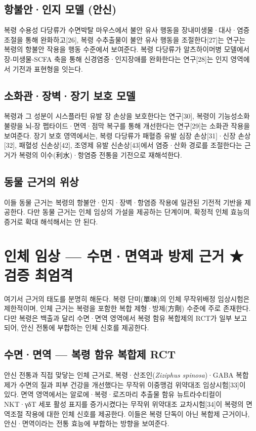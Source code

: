 \documentclass[12pt,oneside]{book}
\begin{document}
\subsection{항불안·인지 모델 (안신)}

복령 수용성 다당류가 수면박탈 마우스에서 불안 유사 행동을 장내미생물·대사·염증 조절을 통해 완화하고[26], 복령 수추출물이 불안 유사 행동을 조절한다[27]는 연구는 복령의 항불안 작용을 행동 수준에서 보여준다. 복령 다당류가 알츠하이머병 모델에서 장-미생물-SCFA 축을 통해 신경염증·인지장애를 완화한다는 연구[28]는 인지 영역에서 기전과 표현형을 잇는다.

\subsection{소화관·장벽·장기 보호 모델}

복령과 그 성분이 시스플라틴 유발 장 손상을 보호한다는 연구[30], 복령이 기능성소화불량을 뇌-장 펩타이드·면역·점막 복구를 통해 개선한다는 연구[29]는 소화관 작용을 보여준다. 장기 보호 영역에서는, 복령 다당류가 패혈증 유발 심장 손상[31]·신장 손상[32], 패혈성 신손상[42], 조영제 유발 신손상[43]에서 염증·산화 경로를 조절한다는 근거가 복령의 이수(利水)·항염증 전통을 기전으로 재해석한다.

\subsection{동물 근거의 위상}

이들 동물 근거는 복령의 항불안·인지·장벽·항염증 작용에 일관된 기전적 기반을 제공한다. 다만 동물 근거는 인체 임상의 가설을 제공하는 단계이며, 확정적 인체 효능의 증거로 확대 해석해서는 안 된다.

\section{인체 임상 — 수면·면역과 방제 근거 ★검증 최엄격}

여기서 근거의 태도를 분명히 해둔다. 복령 단미(單味)의 인체 무작위배정 임상시험은 제한적이며, 인체 근거는 복령을 포함한 복합 제형·방제(方劑) 수준에 주로 존재한다. 다만 복령은 백출과 달리 수면·면역 영역에서 복령 함유 복합제의 RCT가 일부 보고되어, 안신 전통에 부합하는 인체 신호를 제공한다.

\subsection{수면·면역 — 복령 함유 복합제 RCT}

안신 전통과 직접 맞닿는 인체 근거로, 복령·산조인(\textit{Ziziphus spinosa})·GABA 복합제가 수면의 질과 피부 건강을 개선했다는 무작위 이중맹검 위약대조 임상시험[33]이 있다. 면역 영역에서는 알로에·복령·로즈마리 추출물 함유 뉴트라수티컬이 NKT·γδT 세포 활성 표지를 증가시켰다는 무작위 위약대조 교차시험[34]이 복령의 면역조절 작용에 대한 인체 신호를 제공한다. 이들은 복령 단독이 아닌 복합제 근거이나, 안신·면역이라는 전통 효능에 부합하는 방향을 보여준다.
\end{document}

